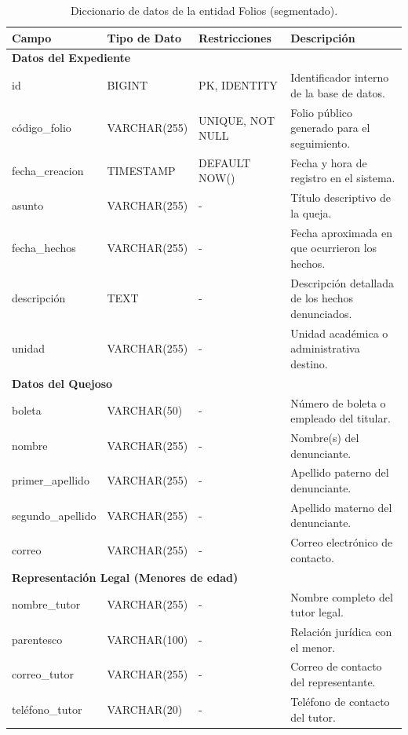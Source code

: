 \begin{table}[H]
\centering
\small
\begin{tabularx}{\textwidth}{|l|l|l|X|}
\hline
\rowcolor{azulESCOM} 
\color{white}\textbf{Campo} & \color{white}\textbf{Tipo de Dato} & \color{white}\textbf{Restricciones} & \color{white}\textbf{Descripci\'on} \\ \hline
\multicolumn{4}{|l|}{\cellcolor[HTML]{EFEFEF}\textbf{Datos del Expediente}} \\ \hline
id & BIGINT & PK, IDENTITY & Identificador interno de la base de datos. \\ \hline
código\_folio & VARCHAR(255) & UNIQUE, NOT NULL & Folio p\'ublico generado para el seguimiento. \\ \hline
fecha\_creacion & TIMESTAMP & DEFAULT NOW() & Fecha y hora de registro en el sistema. \\ \hline
asunto & VARCHAR(255) & - & T\'itulo descriptivo de la queja. \\ \hline
fecha\_hechos & VARCHAR(255) & - & Fecha aproximada en que ocurrieron los hechos. \\ \hline
descripción & TEXT & - & Descripci\'on detallada de los hechos denunciados. \\ \hline
unidad & VARCHAR(255) & - & Unidad acad\'emica o administrativa destino. \\ \hline
\multicolumn{4}{|l|}{\cellcolor[HTML]{EFEFEF}\textbf{Datos del Quejoso}} \\ \hline
boleta & VARCHAR(50) & - & N\'umero de boleta o empleado del titular. \\ \hline
nombre & VARCHAR(255) & - & Nombre(s) del denunciante. \\ \hline
primer\_apellido & VARCHAR(255) & - & Apellido paterno del denunciante. \\ \hline
segundo\_apellido & VARCHAR(255) & - & Apellido materno del denunciante. \\ \hline
correo & VARCHAR(255) & - & Correo electr\'onico de contacto. \\ \hline
\multicolumn{4}{|l|}{\cellcolor[HTML]{EFEFEF}\textbf{Representaci\'on Legal (Menores de edad)}} \\ \hline
nombre\_tutor & VARCHAR(255) & - & Nombre completo del tutor legal. \\ \hline
parentesco & VARCHAR(100) & - & Relaci\'on jur\'idica con el menor. \\ \hline
correo\_tutor & VARCHAR(255) & - & Correo de contacto del representante. \\ \hline
teléfono\_tutor & VARCHAR(20) & - & Tel\'efono de contacto del tutor. \\ \hline
\end{tabularx}
\caption{Diccionario de datos de la entidad Folios (segmentado).}
\label{tab:dict_folios}
\end{table}

